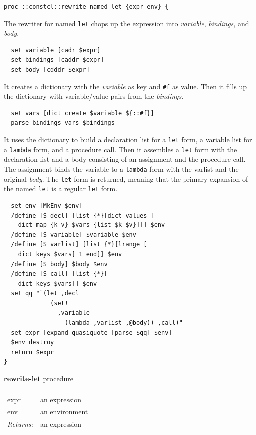 \documentclass[a5paper,draft]{memoir}
\begin{document}
\begin{lstlisting}
proc ::constcl::rewrite-named-let {expr env} {
\end{lstlisting}

The rewriter for named \texttt{let} chops up the expression into \emph{variable}, \emph{bindings}, and \emph{body}.

\begin{lstlisting}
  set variable [cadr $expr]
  set bindings [caddr $expr]
  set body [cdddr $expr]
\end{lstlisting}

It creates a dictionary with the \emph{variable} as key and \texttt{\#f} as value. Then it fills up the dictionary with variable/value pairs from the \emph{bindings}.

\begin{lstlisting}
  set vars [dict create $variable ${::#f}]
  parse-bindings vars $bindings
\end{lstlisting}

It uses the dictionary to build a declaration list for a \texttt{let} form, a variable list for a \texttt{lambda} form, and a procedure call. Then it assembles a \texttt{let} form with the declaration list and a body consisting of an assignment and the procedure call. The assignment binds the variable to a \texttt{lambda} form with the varlist and the original \emph{body}. The \texttt{let} form is returned, meaning that the primary expansion of the named \texttt{let} is a regular \texttt{let} form.

\begin{lstlisting}
  set env [MkEnv $env]
  /define [S decl] [list {*}[dict values [
    dict map {k v} $vars {list $k $v}]]] $env
  /define [S variable] $variable $env
  /define [S varlist] [list {*}[lrange [
    dict keys $vars] 1 end]] $env
  /define [S body] $body $env
  /define [S call] [list {*}[
    dict keys $vars]] $env
  set qq "`(let ,decl
             (set!
               ,variable
                 (lambda ,varlist ,@body)) ,call)"
  set expr [expand-quasiquote [parse $qq] $env]
  $env destroy
  return $expr
}
\end{lstlisting}

\textbf{rewrite-let} procedure

\noindent\begin{tabular}{ |p{1.9cm} p{6.5cm}| }
\hline
\rowcolor[HTML]{CCCCCC} \multicolumn{2}{|l|}{\textbf{rewrite-let (internal)}} \\
expr & an expression \\
env & an environment \\
\textit{Returns:} & an expression \\
\hline
\end{tabular}
\end{document}
